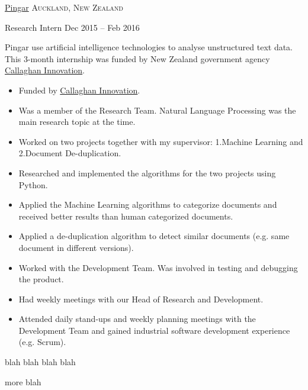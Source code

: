 \documentclass[10pt,a4paper]{article}
\begin{document}
\headedsection
  {\href{http://www.pingar.com/}{Pingar}}
  {\textsc{Auckland, New Zealand}} {

  \headedsubsection
    {Research Intern}
    {Dec 2015 -- Feb 2016}
    {\bodytext
      {
        Pingar use artificial intelligence technologies to analyse unstructured text data.
        This 3-month internship was funded by New Zealand government agency \href{http://www.callaghaninnovation.govt.nz/}{Callaghan Innovation}.

        \begin{itemize}
          \item Funded by \href{http://www.callaghaninnovation.govt.nz/}{Callaghan Innovation}.
          \item Was a member of the Research Team.
                Natural Language Processing was the main research topic at the time.
          \item Worked on two projects together with my supervisor: 1.Machine Learning and 2.Document De-duplication.
          \item Researched and implemented the algorithms for the two projects using Python.
          \item Applied the Machine Learning algorithms to categorize documents and received better results than human categorized documents.
          \item Applied a de-duplication algorithm to detect similar documents (e.g. same document in different versions).
          \item Worked with the Development Team.
                Was involved in testing and debugging the product.
          \item Had weekly meetings with our Head of Research and Development.
          \item Attended daily stand-ups and weekly planning meetings with the Development Team and gained industrial software development experience (e.g. Scrum).
        \end{itemize}
      }
    }
  }

\spacedhrule{-0.2em}{-0.4em}

blah blah blah blah

more blah

\spacedhrule{0.4em}{-0.4em}

\end{document}
